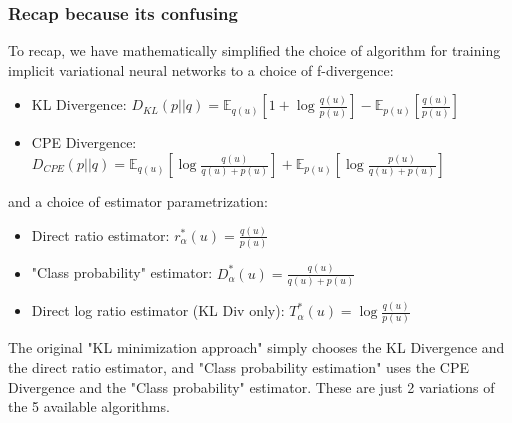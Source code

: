 \documentclass[a4paper,12pt]{article}
\numberwithin{equation}{section}
\begin{document}
\subsubsection{Recap because its confusing}
To recap, we have mathematically simplified the choice of algorithm for training implicit variational neural networks to a choice of f-divergence:
\begin{itemize}
\item KL Divergence: $D_{KL}(p||q)=\mathbb{E}_{q(u)}[1+\log \frac{q(u)}{p(u)}]-\mathbb{E}_{p(u)}\left[\frac{q(u)}{p(u)}\right]$
\item CPE Divergence: $D_{CPE}(p||q)=\mathbb{E}_{q(u)}\left[\log \frac{q(u)}{q(u)+p(u)}\right]+\mathbb{E}_{p(u)}\left[\log \frac{p(u)}{q(u)+p(u)}\right]$
\end{itemize}
and a choice of estimator parametrization:
\begin{itemize}
\item Direct ratio estimator: $r^*_\alpha(u)=\frac{q(u)}{p(u)}$
\item "Class probability" estimator: $D^*_\alpha(u)=\frac{q(u)}{q(u)+p(u)}$
\item Direct log ratio estimator (KL Div only): $T^*_\alpha(u)=\log \frac{q(u)}{p(u)}$
\end{itemize}
The original "KL minimization approach" simply chooses the KL Divergence and the direct ratio estimator, and "Class probability estimation" uses the CPE Divergence and the "Class probability" estimator. These are just 2 variations of the 5 available algorithms.
\end{document}
